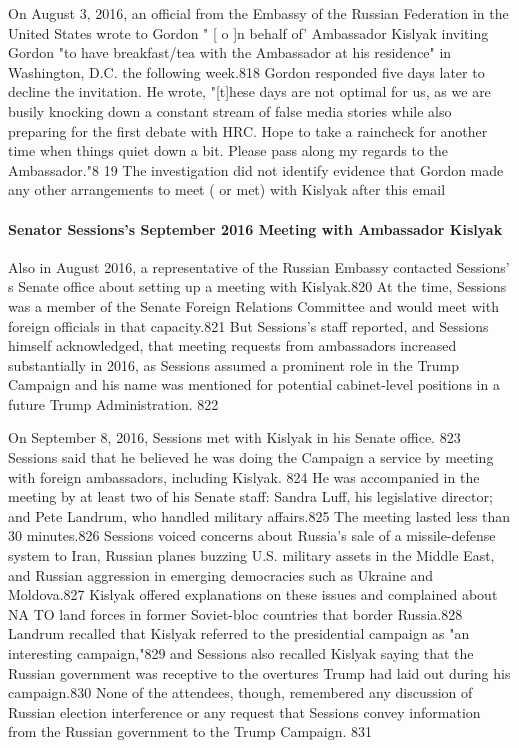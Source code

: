 On August 3, 2016, an official from the Embassy of the Russian Federation in the United States wrote to Gordon " [ o ]n behalf of' Ambassador Kislyak inviting Gordon "to have breakfast/tea with the Ambassador at his residence" in Washington, D.C. the following week.818 Gordon responded five days later to decline the invitation. He wrote, "[t]hese days are not optimal for us, as we are busily knocking down a constant stream of false media stories while also preparing for the first debate with HRC. Hope to take a raincheck for another time when things quiet down a  bit. Please pass along my regards to the Ambassador."8 19 The investigation did not identify evidence that Gordon made any other arrangements to meet ( or met) with Kislyak after this email

\paragraph{Senator Sessions's September 2016 Meeting with Ambassador Kislyak}

Also in August 2016, a representative of the Russian Embassy contacted Sessions' s Senate office about setting up a  meeting with Kislyak.820 At the time,  Sessions was a  member of the Senate Foreign Relations Committee and would meet with foreign officials in that capacity.821 But Sessions's staff reported,  and Sessions himself acknowledged,  that meeting requests from ambassadors increased substantially in 2016, as Sessions assumed a prominent role in the Trump Campaign and his name was mentioned for potential cabinet-level positions in a future Trump Administration. 822

On September 8, 2016,  Sessions met with Kislyak in his Senate office. 823 Sessions said that he believed he was doing the Campaign a  service by meeting with foreign ambassadors, including Kislyak. 824 He was accompanied in the meeting by at least two of his Senate staff: Sandra Luff,  his legislative director; and Pete Landrum, who handled military affairs.825 The meeting lasted less than 30 minutes.826 Sessions voiced concerns about Russia's sale of a missile-defense system to Iran, Russian planes buzzing U.S. military assets in the Middle East, and Russian aggression in emerging democracies such as Ukraine and Moldova.827 Kislyak offered explanations on these issues and complained about NA TO land forces in former Soviet-bloc countries that border Russia.828 Landrum recalled that Kislyak referred to the presidential campaign as "an interesting campaign,"829 and Sessions also recalled Kislyak saying that the Russian government was receptive to the overtures Trump had laid out during his campaign.830 None of the attendees, though, remembered any discussion of Russian election interference or any request that Sessions convey information from the Russian government to the Trump Campaign. 831

